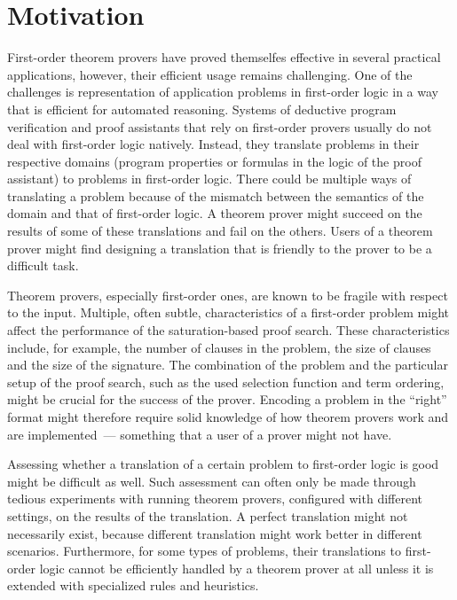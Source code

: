 \section*{Motivation}
First-order theorem provers have proved themselfes effective in several practical applications, however, their efficient usage remains challenging. One of the challenges is representation of application problems in first-order logic in a way that is efficient for automated reasoning. Systems of deductive program verification and proof assistants that rely on first-order provers usually do not deal with first-order logic natively. Instead, they translate problems in their respective domains (program properties or formulas in the logic of the proof assistant) to problems in first-order logic. There could be multiple ways of translating a problem because of the mismatch between the semantics of the domain and that of first-order logic. A theorem prover might succeed on the results of some of these translations and fail on the others. Users of a theorem prover might find designing a translation that is friendly to the prover to be a difficult task.

Theorem provers, especially first-order ones, are known to be fragile with respect to the input. Multiple, often subtle, characteristics of a first-order problem might affect the performance of the saturation-based proof search. These characteristics include, for example, the number of clauses in the problem, the size of clauses and the size of the signature. The combination of the problem and the particular setup of the proof search, such as the used selection function and term ordering, might be crucial for the success of the prover. Encoding a problem in the ``right'' format might therefore require solid knowledge of how theorem provers work and are implemented~--- something that a user of a prover might not have.

Assessing whether a translation of a certain problem to first-order logic is good might be difficult as well. Such assessment can often only be made through tedious experiments with running theorem provers, configured with different settings, on the results of the translation. A perfect translation might not necessarily exist, because different translation might work better in different scenarios. Furthermore, for some types of problems, their translations to first-order logic cannot be efficiently handled by a theorem prover at all unless it is extended with specialized rules and heuristics.

